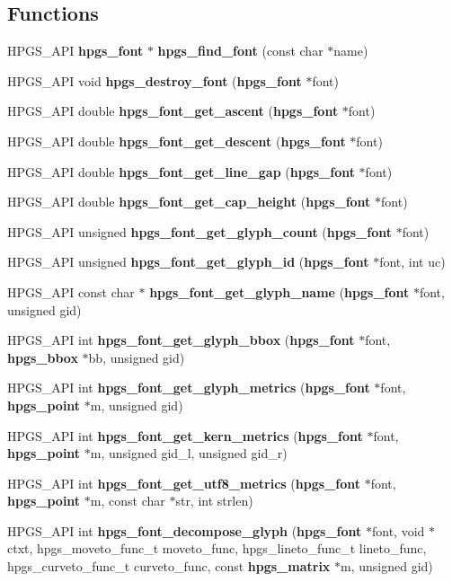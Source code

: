 \subsection*{Functions}
\begin{DoxyCompactItemize}
\item 
HPGS\_\-API {\bf hpgs\_\-font} $\ast$ {\bf hpgs\_\-find\_\-font} (const char $\ast$name)
\item 
HPGS\_\-API void {\bf hpgs\_\-destroy\_\-font} ({\bf hpgs\_\-font} $\ast$font)
\item 
HPGS\_\-API double {\bf hpgs\_\-font\_\-get\_\-ascent} ({\bf hpgs\_\-font} $\ast$font)
\item 
HPGS\_\-API double {\bf hpgs\_\-font\_\-get\_\-descent} ({\bf hpgs\_\-font} $\ast$font)
\item 
HPGS\_\-API double {\bf hpgs\_\-font\_\-get\_\-line\_\-gap} ({\bf hpgs\_\-font} $\ast$font)
\item 
HPGS\_\-API double {\bf hpgs\_\-font\_\-get\_\-cap\_\-height} ({\bf hpgs\_\-font} $\ast$font)
\item 
HPGS\_\-API unsigned {\bf hpgs\_\-font\_\-get\_\-glyph\_\-count} ({\bf hpgs\_\-font} $\ast$font)
\item 
HPGS\_\-API unsigned {\bf hpgs\_\-font\_\-get\_\-glyph\_\-id} ({\bf hpgs\_\-font} $\ast$font, int uc)
\item 
HPGS\_\-API const char $\ast$ {\bf hpgs\_\-font\_\-get\_\-glyph\_\-name} ({\bf hpgs\_\-font} $\ast$font, unsigned gid)
\item 
HPGS\_\-API int {\bf hpgs\_\-font\_\-get\_\-glyph\_\-bbox} ({\bf hpgs\_\-font} $\ast$font, {\bf hpgs\_\-bbox} $\ast$bb, unsigned gid)
\item 
HPGS\_\-API int {\bf hpgs\_\-font\_\-get\_\-glyph\_\-metrics} ({\bf hpgs\_\-font} $\ast$font, {\bf hpgs\_\-point} $\ast$m, unsigned gid)
\item 
HPGS\_\-API int {\bf hpgs\_\-font\_\-get\_\-kern\_\-metrics} ({\bf hpgs\_\-font} $\ast$font, {\bf hpgs\_\-point} $\ast$m, unsigned gid\_\-l, unsigned gid\_\-r)
\item 
HPGS\_\-API int {\bf hpgs\_\-font\_\-get\_\-utf8\_\-metrics} ({\bf hpgs\_\-font} $\ast$font, {\bf hpgs\_\-point} $\ast$m, const char $\ast$str, int strlen)
\item 
HPGS\_\-API int {\bf hpgs\_\-font\_\-decompose\_\-glyph} ({\bf hpgs\_\-font} $\ast$font, void $\ast$ctxt, hpgs\_\-moveto\_\-func\_\-t moveto\_\-func, hpgs\_\-lineto\_\-func\_\-t lineto\_\-func, hpgs\_\-curveto\_\-func\_\-t curveto\_\-func, const {\bf hpgs\_\-matrix} $\ast$m, unsigned gid)

\end{DoxyCompactItemize}
